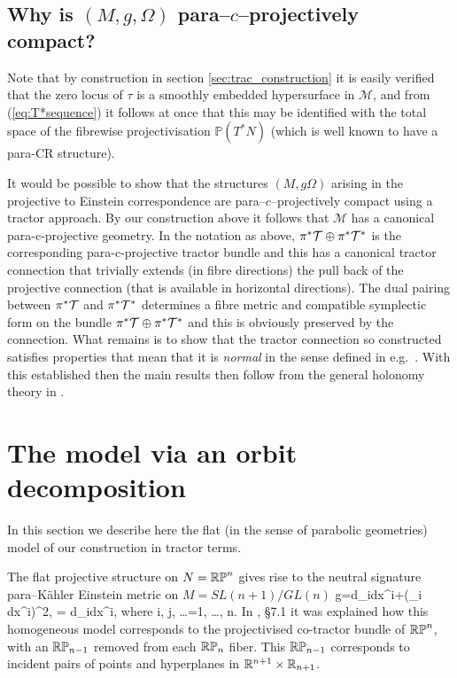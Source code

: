 \subsection{Why is $(M,g,\Omega)$ para--$c$--projectively compact?}
Note that by construction in section \ref{sec:trac_construction} it is easily verified that the zero locus of $\tau$ is a smoothly embedded hypersurface in $\mathcal{M}$,  and from (\ref{eq:T*sequence}) it follows at once that this may be identified with the total space of the fibrewise projectivisation $\mathbb{P}(T^*N)$ (which is well known to have a para-CR structure).

It would be possible to show that the structures $(M,g\Omega)$ arising in the projective to Einstein correspondence are para--$c$--projectively compact using a tractor approach. By our construction above it follows that $\mathcal{M}$ has a canonical para-c-projective geometry. In the notation as above, $\pi^*{\mathcal{T}}\oplus
\pi^*{\mathcal{T}^*}$ is the corresponding para-c-projective tractor bundle
and this has a canonical tractor connection that trivially
extends (in fibre directions) the pull back of the projective
connection (that is available in horizontal directions). The
dual pairing between $\pi^*{\mathcal{T}}$ and $\pi^*{\mathcal{T}^*}$ determines a
fibre metric and compatible symplectic form on the bundle
$\pi^*{\mathcal{T}}\oplus \pi^*{\mathcal{T}^*}$ and this is obviously preserved by the
connection. What remains is to show that the tractor connection so
constructed satisfies properties that mean that it is {\em normal} in
the sense defined in e.g.\ \cite{CS-book}. With this established then
the main results then follow from the general holonomy theory in
\cite{CGH-duke}.


\section{The model via an orbit decomposition}


In this section we describe here the flat (in the sense of parabolic
geometries) model \cite{CDT13, DM} of our construction in tractor
terms.

The flat projective structure on $N=\mathbb{RP}^n$ gives rise to 
the neutral signature para--K\"ahler Einstein metric on $M=SL(n+1)/GL(n)$
\be
\label{DM_metric}
g=d\xi_i\odot dx^i+(\xi_i dx^i)^2, \quad \Omega= d\xi_i\wedge dx^i, \quad\mbox{where}\quad
i, j, \dots =1, \dots, n.
\ee
In \cite{DM}, \S 7.1 it was explained how this homogeneous model
corresponds to the projectivised co-tractor bundle of $\mathbb{RP}^n$, with
an $\mathbb{RP}_{n-1}$ removed from each $\mathbb{RP}_n$ fiber. This $\mathbb{RP}_{n-1}$
corresponds to incident pairs of points and hyperplanes in $\mathbb{R}^{n+1}\times\mathbb{R}_{n+1}$.


